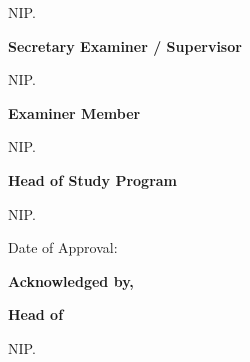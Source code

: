 {\begin{center}
\begin{singlespace}
    \chairexaminer\par
    NIP. \NIPchairexaminer\par
    \vspace{\baselineskip}
    \textbf{\selectfont Secretary Examiner / Supervisor}\par
    \vspace{2\baselineskip}
    \supervisor\par
    NIP. \NIPsupervisor\par
    \vspace{\baselineskip}
    \textbf{\selectfont Examiner Member}\par
    \vspace{2\baselineskip}
    \examinermenber\par
    NIP. \NIPexaminermember\par
    \vspace{2\baselineskip}
    \textbf{\selectfont Head of Study Program \studyprogram}\par
    \vspace{2\baselineskip}
    \programhead\par
    NIP. \NIPprogramhead\par
    \vspace{\baselineskip}
    \hspace{2cm}Date of Approval: \underline{\hspace{2.5cm}}\par
    \textbf{\selectfont Acknowledged by,}\par
    \textbf{\selectfont Head of \department}\par
    \vspace{3\baselineskip}
    \departmenthead\par
    NIP. \NIPdepthead\par
    \end{singlespace}
    \end{center}
}

\restoregeometry
